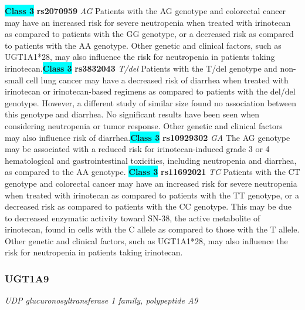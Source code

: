 \documentclass{report}
\begin{document}
\textbf{\colorbox{cyan} {Class 3}} \textbf{ rs2070959 } \textit{ AG }
Patients with the AG genotype and colorectal cancer may have an increased risk for severe neutropenia when treated with irinotecan as compared to patients with the GG genotype, or a decreased risk as compared to patients with the AA genotype. Other genetic and clinical factors, such as UGT1A1*28, may also influence the risk for neutropenia in patients taking irinotecan.\newline\textbf{\colorbox{cyan} {Class 3}} \textbf{ rs3832043 } \textit{ T/del }
Patients with the T/del genotype and non-small cell lung cancer may have a decreased risk of diarrhea when treated with irinotecan or irinotecan-based regimens as compared to patients with the del/del genotype. However, a different study of similar size found no association between this genotype and diarrhea. No significant results have been seen when considering neutropenia or tumor response. Other genetic and clinical factors may also influence risk of diarrhea.\newline\textbf{\colorbox{cyan} {Class 3}} \textbf{ rs10929302 } \textit{ GA }
The AG genotype may be associated with a reduced risk for irinotecan-induced grade 3 or 4 hematological and gastrointestinal toxicities, including neutropenia and diarrhea, as compared to the AA genotype. \newline\textbf{\colorbox{cyan} {Class 3}} \textbf{ rs11692021 } \textit{ TC }
Patients with the CT genotype and colorectal cancer may have an increased risk for severe neutropenia when treated with irinotecan as compared to patients with the TT genotype, or a decreased risk as compared to patients with the CC genotype. This may be due to decreased enzymatic activity toward SN-38, the active metabolite of irinotecan, found in cells with the C allele as compared to those with the T allele. Other genetic and clinical factors, such as UGT1A1*28, may also influence the risk for neutropenia in patients taking irinotecan.\newline\subsubsection{ UGT1A9 }
\textit{ UDP glucuronosyltransferase 1 family, polypeptide A9 }
\end{document}
